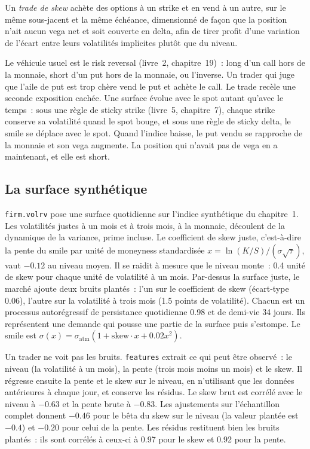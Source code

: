 \begin{definition}\label{def:s2:skew-and-term-structure-relative-value:skew}
Un \emph{trade de skew} achète des options à un strike et en vend à un autre, sur le même sous-jacent et la même échéance, dimensionné de façon que la
position n'ait aucun vega net et soit couverte en delta, afin de tirer profit d'une variation de l'écart entre leurs volatilités implicites plutôt que du
niveau.
\end{definition}

Le véhicule usuel est le risk reversal (livre~2, chapitre~19)~: long d'un call hors de la monnaie, short d'un put hors de la monnaie, ou l'inverse. Un trader
qui juge que l'aile de put est trop chère vend le put et achète le call. Le trade recèle une seconde exposition cachée. Une surface évolue avec le spot autant
qu'avec le temps~: sous une règle de sticky strike (livre~5, chapitre~7), chaque strike conserve sa volatilité quand le spot bouge, et sous une règle de sticky delta, le smile se déplace avec
le spot. Quand l'indice baisse, le put vendu se rapproche de la monnaie et son vega augmente. La position qui n'avait pas de vega en a maintenant, et elle est short.

\subsection*{La surface synthétique}

\texttt{firm.volrv} pose une surface quotidienne sur l'indice synthétique du chapitre~1. Les volatilités justes à un mois et à trois mois, à la monnaie, découlent de la
dynamique de la variance, prime incluse. Le coefficient de skew juste, c'est-à-dire la pente du smile par unité de moneyness standardisée $x = \ln(K/S)/(\sigma\sqrt\tau)$,
vaut $-0.12$ au niveau moyen. Il se raidit à mesure que le niveau monte~: 0.4 unité de skew pour chaque unité de volatilité à un mois. Par-dessus la surface juste, le
marché ajoute deux bruits plantés~: l'un sur le coefficient de skew (écart-type 0.06), l'autre sur la volatilité à trois mois (1.5 points de volatilité). Chacun est un
processus autorégressif de persistance quotidienne 0.98 et de demi-vie 34 jours. Ils représentent une demande qui pousse une partie de la surface puis s'estompe. Le
smile est $\sigma(x) = \sigma_{\mathrm{atm}}(1 + \text{skew}\cdot x + 0.02x^2)$.

Un trader ne voit pas les bruits. \texttt{features} extrait ce qui peut être observé~: le niveau (la volatilité à un mois), la pente (trois mois moins un mois) et
le skew. Il régresse ensuite la pente et le skew sur le niveau, en n'utilisant que les données antérieures à chaque jour, et conserve les résidus. Le skew brut est corrélé avec le
niveau à $-0.63$ et la pente brute à $-0.83$. Les ajustements sur l'échantillon complet donnent $-0.46$ pour le bêta du skew sur le niveau (la valeur plantée est $-0.4$) et $-0.20$ pour
celui de la pente. Les résidus restituent bien les bruits plantés~: ils sont corrélés à ceux-ci à 0.97 pour le skew et 0.92 pour la pente.


